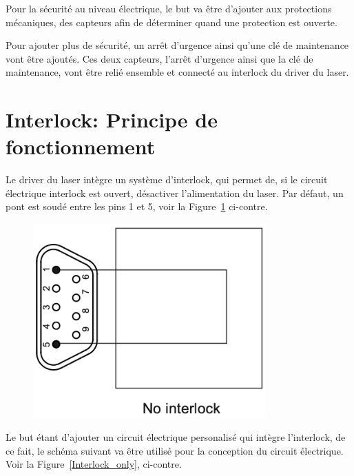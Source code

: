Pour la sécurité au niveau électrique, le but va être d'ajouter aux protections mécaniques, des capteurs afin de déterminer quand une protection est ouverte.

Pour ajouter plus de sécurité, un arrêt d'urgence ainsi qu'une clé de maintenance vont être ajoutés. Ces deux capteurs, l'arrêt d'urgence ainsi que la clé de maintenance, vont être relié ensemble et connecté au interlock du driver du laser.

\section{Interlock: Principe de fonctionnement}

\begin{minipage}[c]{0.6\textwidth}
    Le driver du laser intègre un système d'interlock, qui permet de, si le circuit électrique interlock est ouvert, désactiver l'alimentation du laser. Par défaut, un pont est soudé entre les pins 1 et 5, voir la Figure~\ref{No_interlock} ci-contre.
\end{minipage}\hfill
\begin{minipage}[c]{0.35\textwidth}
    \begin{figure}[H]
        \begin{center}
            \includegraphics[width=0.8\textwidth]{assets/figures/Protections_laser/Securite_electrique/no_interlock.png}
        \end{center}
        \label{No_interlock}
    \end{figure}
\end{minipage}
\begin{minipage}[c]{0.6\textwidth}
    Le but étant d'ajouter un circuit électrique personalisé qui intègre l'interlock, de ce fait, le schéma suivant va être utilisé pour la conception du circuit électrique. Voir la Figure~\ref{Interlock_only}, ci-contre.
\end{minipage}\hfill
